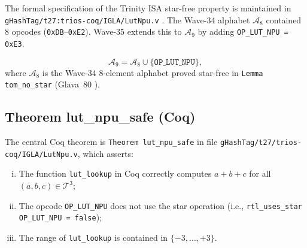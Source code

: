 The formal specification of the Trinity ISA star-free property is maintained
in \texttt{gHashTag/t27:trios-coq/IGLA/LutNpu.v}
\cite{coq_lut_npu_t27_651}.  The Wave-34 alphabet $\mathcal{A}_8$ contained
8 opcodes (\texttt{0xDB}--\texttt{0xE2}).  Wave-35 extends this to
$\mathcal{A}_9$ by adding \texttt{OP\_LUT\_NPU = 0xE3}.

\begin{definition}
\label{def:alphabet_9}
\[
  \mathcal{A}_9 = \mathcal{A}_8 \cup \bigl\{\mathtt{OP\_LUT\_NPU}\bigr\},
\]
where $\mathcal{A}_8$ is the Wave-34 8-element alphabet proved star-free in
\texttt{Lemma tom\_no\_star} (Glava~80 \cite{glava80_tom_layer_gate}).
\end{definition}

\subsection{Theorem lut\_npu\_safe (Coq)}

The central Coq theorem is \texttt{Theorem lut\_npu\_safe} in file
\texttt{gHashTag/t27/trios-coq/IGLA/LutNpu.v}, which asserts:
\begin{enumerate}[(i)]
  \item The function \texttt{lut\_lookup} in Coq correctly computes $a+b+c$
    for all $(a,b,c) \in \mathcal{T}^3$;
  \item The opcode \texttt{OP\_LUT\_NPU} does not use the star operation
    (i.e., \texttt{rtl\_uses\_star OP\_LUT\_NPU = false});
  \item The range of \texttt{lut\_lookup} is contained in $\{-3,\ldots,+3\}$.
\end{enumerate}

